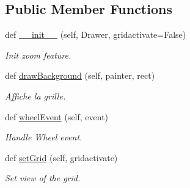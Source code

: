 \subsection*{Public Member Functions}
\begin{DoxyCompactItemize}
\item 
\mbox{\label{classInterface_1_1myview_a90f17253d3cd75ebbba7817935f07b6e}} 
def \mbox{\hyperlink{classInterface_1_1myview_a90f17253d3cd75ebbba7817935f07b6e}{\+\_\+\+\_\+init\+\_\+\+\_\+}} (self, Drawer, gridactivate=False)
\begin{DoxyCompactList}\small\item\em Init zoom feature. \end{DoxyCompactList}\item 
\mbox{\label{classInterface_1_1myview_ae4ab68a8b40208f1177df2c14b874933}} 
def \mbox{\hyperlink{classInterface_1_1myview_ae4ab68a8b40208f1177df2c14b874933}{draw\+Background}} (self, painter, rect)
\begin{DoxyCompactList}\small\item\em Affiche la grille. \end{DoxyCompactList}\item 
def \mbox{\hyperlink{classInterface_1_1myview_a63712be7f2a54a99fe62bfaaf7e77c67}{wheel\+Event}} (self, event)
\begin{DoxyCompactList}\small\item\em Handle Wheel event. \end{DoxyCompactList}\item 
\mbox{\label{classInterface_1_1myview_aefbfd46a8c34de7c883d9041f6c7e42c}} 
def \mbox{\hyperlink{classInterface_1_1myview_aefbfd46a8c34de7c883d9041f6c7e42c}{set\+Grid}} (self, gridactivate)
\begin{DoxyCompactList}\small\item\em Set view of the grid. \end{DoxyCompactList}\end{DoxyCompactItemize}

